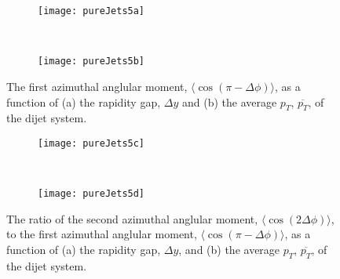 	\begin{figure}[H]
		\centering
		\begin{subfigure}[b]{0.48\textwidth}
			\texttt{[image: pureJets5a]}
			\caption{}
			\label{fig:}
		\end{subfigure}
		~
		\begin{subfigure}[b]{0.48\textwidth}
			\texttt{[image: pureJets5b]}
			\caption{}
			\label{fig:}
		\end{subfigure}
		\caption{The first azimuthal anglular moment, $\langle \cos(\pi-\Delta\phi)\rangle$, as a function of (a) the rapidity gap, $\Delta y$
		         and (b) the average $p_T$, $\overline{p_T}$, of the dijet system.}
		\label{fig:}

		\begin{subfigure}[b]{0.48\textwidth}
			\texttt{[image: pureJets5c]}
			\caption{}
			\label{fig:}
		\end{subfigure}
		~
		\begin{subfigure}[b]{0.48\textwidth}
			\texttt{[image: pureJets5d]}
			\caption{}
			\label{fig:}
		\end{subfigure}
		\caption{The ratio of the second azimuthal anglular moment, $\langle \cos(2\Delta\phi)\rangle$, to the first azimuthal
		         anglular moment, $\langle \cos(\pi-\Delta\phi)\rangle$, as a function of (a) the rapidity gap, $\Delta y$, and (b) the
		         average $p_T$, $\overline{p_T}$, of the dijet system.}
		\label{fig:}
	\end{figure}

